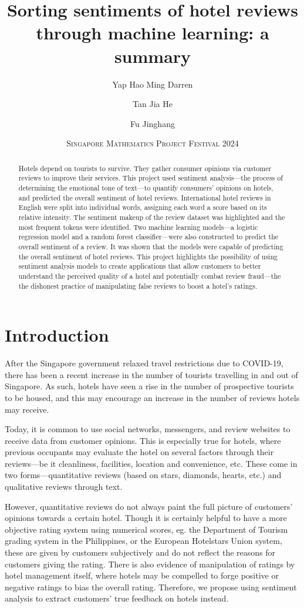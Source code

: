 \documentclass[11pt, a4paper]{pancake-article}
\title{Sorting sentiments of hotel reviews through machine learning: a summary}
\author{Yap Hao Ming Darren \and Tan Jia He \and Fu Jinghang}
\date{\scshape Singapore Mathematics Project Festival 2024}
\begin{document}
\pagestyle{plain}

\maketitle

\begin{abstract}
	Hotels depend on tourists to survive. They gather consumer opinions via customer
	reviews to improve their services. This project used sentiment analysis---the
	process of determining the emotional tone of text---to quantify consumers'
	opinions on hotels, and predicted the overall sentiment of hotel reviews.
	International hotel reviews in English were split into individual words,
	assigning each word a score based on its relative intensity. The sentiment
	makeup of the review dataset was highlighted and the most frequent tokens were
	identified. Two machine learning models---a logistic regression model and a random
	forest classifier---were also constructed to predict the overall sentiment of a
	review. It was shown that the models were capable of predicting the overall
	sentiment of hotel reviews. This project highlights the possibility of using
	sentiment analysis models to create applications that allow customers to better
	understand the perceived quality of a hotel and potentially combat review fraud---the
	the dishonest practice of manipulating false reviews to boost a hotel's ratings.
\end{abstract}

\section{Introduction}
After the Singapore government relaxed travel restrictions due to COVID-19,
there has been a recent increase in the number of tourists travelling in and out of Singapore.
As such, hotels have seen a rise in the number of prospective tourists to be housed,
and this may encourage an increase in the number of reviews hotels may receive.

Today, it is common to use social networks, messengers, and review websites
to receive data from customer opinions. This is especially true for hotels,
where previous occupants may evaluate the hotel on several factors through their
reviews---be it cleanliness, facilities, location and convenience, etc.
These come in two forms---quantitative reviews (based on stars, diamonds,
hearts, etc.) and qualitative reviews through text.

However, quantitative reviews do not always paint the full picture of customers'
opinions towards a certain hotel. Though it is certainly helpful to have a more
objective rating system using numerical scores, eg. the Department of Tourism
grading system in the Philippines, or the European Hotelstars Union system,
these are given by customers subjectively and do not reflect the reasons for
customers giving the rating. There is also evidence of manipulation of ratings
by hotel management itself, where hotels may be compelled to forge positive or
negative ratings to bias the overall rating.
Therefore, we propose using sentiment analysis to extract customers' true
feedback on hotels instead.
\end{document}
